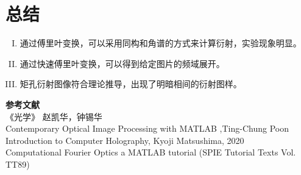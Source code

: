 \documentclass[a4paper,12pt]{article}
\begin{document}
	\section{总结}
	\begin{enumerate}[I.]
\item 通过傅里叶变换，可以采用同构和角谱的方式来计算衍射，实验现象明显。
\item 通过快速傅里叶变换，可以得到给定图片的频域展开。
\item 矩孔衍射图像符合理论推导，出现了明暗相间的衍射图样。
\end{enumerate}
	\textbf{参考文献}\\ \relax
[1]《光学》 赵凯华，钟锡华\\ \relax
[2]Contemporary Optical Image Processing with MATLAB  ,Ting-Chung Poon\\ \relax
[3]Introduction to Computer Holography, Kyoji Matsushima, 2020\\ \relax
[4]Computational Fourier Optics a MATLAB tutorial (SPIE Tutorial Texts Vol. TT89)

	
\end{document}
